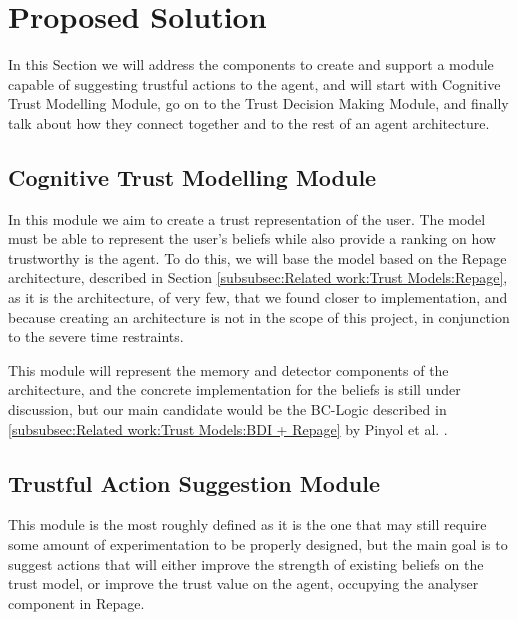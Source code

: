 \section{Proposed Solution}
\label{sec:Solution}
In this Section we will address the components to create and support a module capable of suggesting trustful actions to the agent, and will start with Cognitive Trust Modelling Module, go on to the Trust Decision Making Module, and finally talk about how they connect together and to the rest of an agent architecture.


\subsection{Cognitive Trust Modelling Module}
\label{subsec:Solution:Trust Assessment Module}
In this module we aim to create a trust representation of the user. The model must be able to represent the user's beliefs while also provide a ranking on how trustworthy is the agent. To do this, we will base the model based on the Repage architecture, described in Section \ref{subsubsec:Related work:Trust Models:Repage}, as it is the architecture, of very few, that we found closer to implementation, and because creating an architecture is not in the scope of this project, in conjunction to the severe time restraints.

This module will represent the memory and detector components of the architecture, and the concrete implementation for the beliefs is still under discussion, but our main candidate would be the BC-Logic described in \ref{subsubsec:Related work:Trust Models:BDI + Repage} by Pinyol et al. \cite{Pinyol2009}.



\subsection{Trustful Action Suggestion Module}
\label{subsec:Solution:Trust Decision Making Module}
This module is the most roughly defined as it is the one that may still require some amount of experimentation to be properly designed, but the main goal is to suggest actions that will either improve the strength of existing beliefs on the trust model, or improve the trust value on the agent, occupying the analyser component in Repage.
